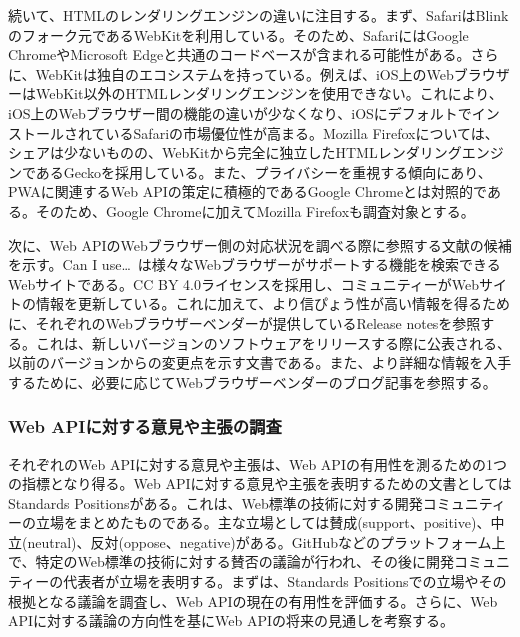 続いて、HTMLのレンダリングエンジンの違いに注目する。まず、SafariはBlinkのフォーク元であるWebKitを利用している。そのため、SafariにはGoogle ChromeやMicrosoft Edgeと共通のコードベースが含まれる可能性がある。さらに、WebKitは独自のエコシステムを持っている。例えば、iOS上のWebブラウザーはWebKit以外のHTMLレンダリングエンジンを使用できない。これにより、iOS上のWebブラウザー間の機能の違いが少なくなり、iOSにデフォルトでインストールされているSafariの市場優位性が高まる。Mozilla Firefoxについては、シェアは少ないものの、WebKitから完全に独立したHTMLレンダリングエンジンであるGeckoを採用している。また、プライバシーを重視する傾向にあり、PWAに関連するWeb APIの策定に積極的であるGoogle Chromeとは対照的である。そのため、Google Chromeに加えてMozilla Firefoxも調査対象とする。

次に、Web APIのWebブラウザー側の対応状況を調べる際に参照する文献の候補を示す。Can I use…~\cite{CanIUse}は様々なWebブラウザーがサポートする機能を検索できるWebサイトである。CC BY 4.0ライセンスを採用し、コミュニティーがWebサイトの情報を更新している。これに加えて、より信ぴょう性が高い情報を得るために、それぞれのWebブラウザーベンダーが提供しているRelease notesを参照する。これは、新しいバージョンのソフトウェアをリリースする際に公表される、以前のバージョンからの変更点を示す文書である。また、より詳細な情報を入手するために、必要に応じてWebブラウザーベンダーのブログ記事を参照する。
\subsubsection{Web APIに対する意見や主張の調査}
\label{subsubsection:Web APIに対する意見や主張の調査}
それぞれのWeb APIに対する意見や主張は、Web APIの有用性を測るための1つの指標となり得る。Web APIに対する意見や主張を表明するための文書としてはStandards Positionsがある。これは、Web標準の技術に対する開発コミュニティーの立場をまとめたものである。主な立場としては賛成(support、positive)、中立(neutral)、反対(oppose、negative)がある。GitHubなどのプラットフォーム上で、特定のWeb標準の技術に対する賛否の議論が行われ、その後に開発コミュニティーの代表者が立場を表明する。まずは、Standards Positionsでの立場やその根拠となる議論を調査し、Web APIの現在の有用性を評価する。さらに、Web APIに対する議論の方向性を基にWeb APIの将来の見通しを考察する。

